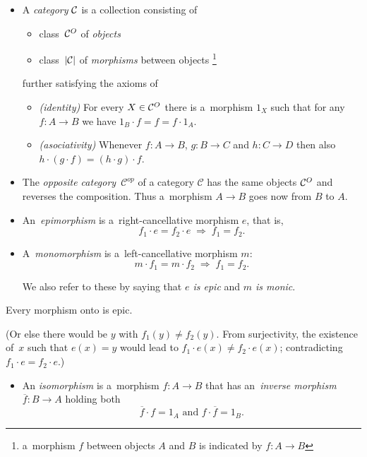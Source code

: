 \begin{itemize}
\item A \emph{category} $\mathcal{C}$ is a collection consisting of
  \begin{itemize}
  \item class~$\mathcal{C}^O$ of \emph{objects\/}
  \item class~$|\mathcal{C}|$ of \emph{morphisms\/} between objects\thinspace%
  \footnote{a~morphism $f$ between objects $A$ and $B$ is indicated by $f\colon
    A \to B$}
  \end{itemize}
further satisfying the axioms of
  \begin{itemize}
  \item \emph{(identity)\/}
  For every $X\in \mathcal{C}^O$ there is a~morphism $1_X$ such that for any $f\colon
  A \to B$ we have $1_B \cdot f = f = f \cdot 1_A$.
  \item \emph{(asociativity)\/}
  Whenever $f\colon A \to B$, $g\colon B \to C$ and $h\colon C \to D$ then also $h
  \cdot (g \cdot f) = (h \cdot g) \cdot f$.
  \end{itemize}

\item The \emph{opposite category}~$\mathcal{C}^{op}$ of a category
$\mathcal{C}$ has the same objects $\mathcal{C}^O$ and reverses the composition.
Thus a~morphism $A \to B$ goes now from $B$ to $A$.

\item An~\emph{epimorphism} is a~right-cancellative morphism $e$, that is,
\[
  f_1 \cdot e = f_2 \cdot e \; \Longrightarrow \; f_1 = f_2.
\]

\item A~\emph{monomorphism} is a~left-cancellative morphism $m$:
\[
  m \cdot f_1 = m \cdot f_2 \; \Longrightarrow \; f_1 = f_2.
\]

We also refer to these by saying that \emph{$e$ is epic\/} and \emph{$m$ is
monic\/}.
\end{itemize}

\begin{fact} \label{fct:onto->epic}
  Every morphism onto is epic.
\end{fact}
(Or else there would be $y$ with $f_1(y) \ne f_2(y)$.
 From surjectivity, the existence of~$x$ such that $e(x) = y$ would lead to
 $f_1 \cdot e(x) \ne f_2 \cdot e(x)$; contradicting $f_1 \cdot e = f_2 \cdot
 e$.)

\begin{itemize}
\item An \emph{isomorphism} is a~morphism $f\colon A \to B$ that has
an~\emph{inverse morphism\/} $\overline{f}\colon B \to A$ holding both
\[
  \overline{f} \cdot f = 1_A \text{ and } f \cdot \overline{f} = 1_B.
\]
\end{itemize}

